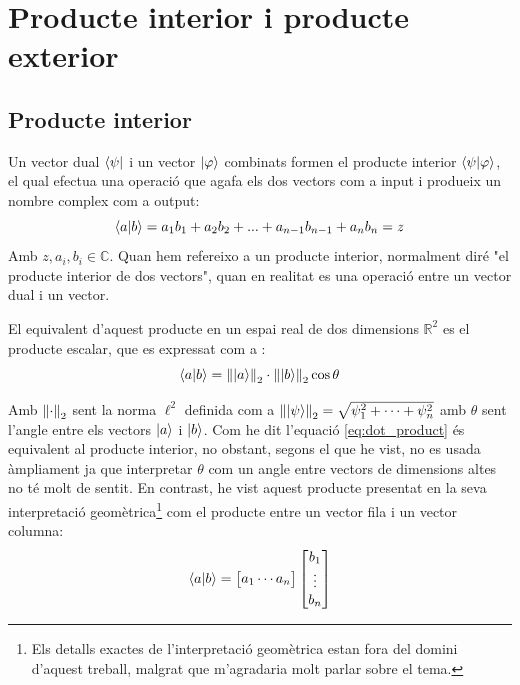 \section{Producte interior i producte exterior}

\subsection{Producte interior}
Un vector dual $\bra{\psi}$ i un vector $\ket{\varphi}$ combinats formen el producte interior $\bra{\psi}\ket{\varphi}$, el qual efectua una operació que agafa els dos vectors com a input i produeix un nombre complex com a output:
$$
\bra{a}\ket{b} = a_1 b_1 + a_2 b_2 + ... + a_{n-1} b_{n-1} + a_n b_n = z
$$
Amb $z, a_i, b_i \in \mathbb{C}$. Quan hem refereixo a un producte interior, normalment diré "el producte interior de dos vectors", quan en realitat es una operació entre un vector dual i un vector.

El equivalent d'aquest producte en un espai real de dos dimensions $\mathbb{R}^2$ es el producte escalar, que es expressat com a :
\begin{equation}
	\bra{a}\ket{b} = \norm{\ket{a}}_2 \cdot \norm{\ket{b}}_2 \cos \theta 
	\label{eq:dot_product}
\end{equation}


Amb $\norm{\cdot}_2$ sent la norma $\ell^2$  definida com a $\norm{\ket{\psi}}_2 = \sqrt{\psi_{1}^2 + \cdots + \psi_{n}^2}$ amb $\theta$ sent l'angle entre els vectors $\ket{a}$ i $\ket{b}$. Com he dit l'equació \eqref{eq:dot_product} és equivalent al producte interior, no obstant, segons el que he vist, no es usada àmpliament ja que interpretar $\theta$ com un angle entre vectors de dimensions altes no té molt de sentit. En contrast, he vist aquest producte presentat en la seva interpretació geomètrica\footnote{Els detalls exactes de l'interpretació geomètrica estan fora del domini d'aquest treball, malgrat que m'agradaria molt parlar sobre el tema.} com el producte entre un vector fila i un vector columna: 
$$
\bra{a}\ket{b} = \begin{bmatrix}a_1  \cdots  a_n \end{bmatrix} \begin{bmatrix} b_{1} \\ \vdots \\ b_{n} \end{bmatrix}
$$

